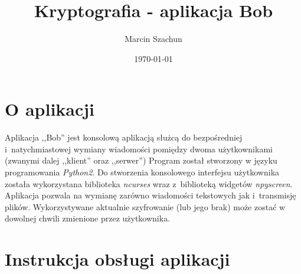 \documentclass{article}
\title{Kryptografia - aplikacja Bob}
\date{\today}
\author{Marcin Szachun}
\begin{document}
\maketitle
\newpage
{}

\tableofcontents
\newpage

\section{O aplikacji}
  Aplikacja ,,Bob'' jest konsolową aplikacją służcą do bezpośredniej i~natychmiastowej wymiany wiadomości pomiędzy
  dwoma użytkownikami (zwanymi dalej ,,klient'' oraz ,,serwer'')
  Program został stworzony w języku programowania \emph{Python2}. Do stworzenia konsolowego interfejsu użytkownika
  została wykorzystana biblioteka \emph{ncurses} wraz z~biblioteką widgetów \emph{npyscreen}.
  Aplikacja pozwala na wymianę zarówno wiadomości tekstowych jak i~transmisję plików. Wykorzystywane aktualnie
  szyfrowanie (lub jego brak) może zostać w dowolnej chwili zmienione przez użytkownika.

\section{Instrukcja obsługi aplikacji}
\end{document}
